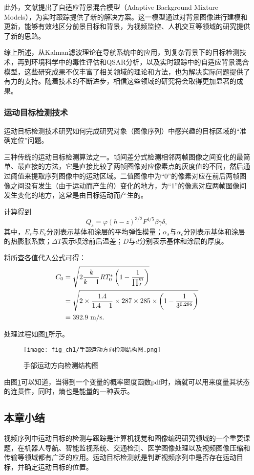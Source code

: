 此外，文献\cite{Stauffer1999}提出了自适应背景混合模型（Adaptive Background Mixture Models），为实时跟踪提供了新的解决方案。这一模型通过对背景图像进行建模和更新，能够有效地区分前景目标和背景，为视频监控、人机交互等领域的研究提供了新的思路。

综上所述，从Kalman滤波理论在导航系统中的应用，到复杂背景下的目标检测技术，再到环境科学中的毒性评估和QSAR分析，以及实时跟踪中的自适应背景混合模型，这些研究成果不仅丰富了相关领域的理论和方法，也为解决实际问题提供了有力的支持。随着技术的不断进步，相信这些领域的研究将会取得更加显著的成果。

\subsubsection{运动目标检测技术}

运动目标检测技术研究如何完成研究对象（图像序列）中感兴趣的目标区域的“准确定位”问题。


三种传统的运动目标检测算法之一。帧间差分式检测相邻两帧图像之间变化的最简单、最直接的方法，它是直接比较了两帧图像对应像素点的灰度值的不同，然后通过阈值来提取序列图像中的运动区域。二值图像中为“$0$”的像素对应在前后两帧图像之间没有发生（由于运动而产生的）变化的地方，为“1”的像素对应两帧图像间发生变化的地方，这常是由目标运动而产生的。

计算得到
\begin{equation}%
Q_s = \varphi(h-z)^{3/2}F^{4/5}\beta\gamma\delta,
\end{equation}
其中，$E_s$与$E_c$分别表示基体和涂层的平均弹性模量；$\alpha_s$与$\alpha_c$分别表示基体和涂层的热膨胀系数；$\Delta T$表示喷涂前后温差；$D$与$d$分别表示基体和涂层的厚度。

将所查各值代入公式可得：
\begin{align}%
  C_0 &= \sqrt{ 2\frac{k}{k-1}RT_0^{\ast}\lt(1-\frac{1}{\prod_{T}^{m}}\rt) } \notag \\
   &= \sqrt{ 2\times \frac{1.4}{1.4-1}\times 287\times 285\times \lt( 1-\frac{1}{3^{0.286}} \rt) } \notag \\
   &= 392.9~\unit{m/s}.
\end{align}

处理过程如图\ref{fig:手部运动方向检测结构图}所示。
\begin{figure}[H]
  \centering
  \texttt{[image: fig\_ch1/手部运动方向检测结构图.png]}
  \caption{手部运动方向检测结构图}
  \label{fig:手部运动方向检测结构图}
\end{figure}

由图\ref{fig:手部运动方向检测结构图}可以知道，当得到一个变量的概率密度函数pdf时，熵就可以用来度量其状态的连贯性，同时，熵也是能量的一种表示。

\subsection{本章小结}

视频序列中运动目标的检测与跟踪是计算机视觉和图像编码研究领域的一个重要课题，在机器人导航、智能监视系统、交通检测、医学图像处理以及视频图像压缩和传输等领域都有广泛的应用。运动目标检测就是判断视频序列中是否存在运动目标，并确定运动目标的位置。